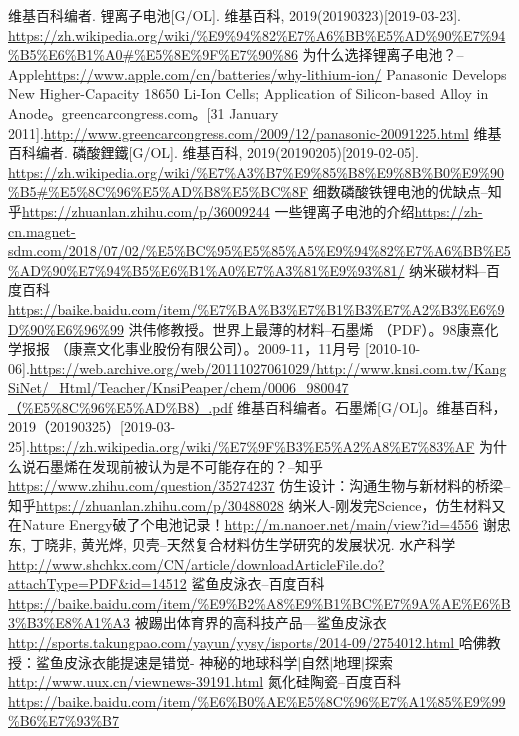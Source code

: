 \documentclass[UTF8,9pt]{ctexart}
\begin{document}
\begin{thebibliography}{99}  
    维基百科编者. 锂离子电池[G/OL]. 维基百科, 2019(20190323)[2019-03-23]. \url{https://zh.wikipedia.org/wiki/%E9%94%82%E7%A6%BB%E5%AD%90%E7%94%B5%E6%B1%A0#%E5%8E%9F%E7%90%86}
    为什么选择锂离子电池？--Apple\url{https://www.apple.com/cn/batteries/why-lithium-ion/}
    Panasonic Develops New Higher-Capacity 18650 Li-Ion Cells; Application of Silicon-based Alloy in Anode。greencarcongress.com。[31 January 2011].\url{http://www.greencarcongress.com/2009/12/panasonic-20091225.html}
    维基百科编者. 磷酸鋰鐵[G/OL]. 维基百科, 2019(20190205)[2019-02-05]. \url{https://zh.wikipedia.org/wiki/%E7%A3%B7%E9%85%B8%E9%8B%B0%E9%90%B5#%E5%8C%96%E5%AD%B8%E5%BC%8F}
    细数磷酸铁锂电池的优缺点--知乎\url{https://zhuanlan.zhihu.com/p/36009244}
    一些锂离子电池的介绍\url{https://zh-cn.magnet-sdm.com/2018/07/02/%E5%BC%95%E5%85%A5%E9%94%82%E7%A6%BB%E5%AD%90%E7%94%B5%E6%B1%A0%E7%A3%81%E9%93%81/}
    纳米碳材料--百度百科\url{https://baike.baidu.com/item/%E7%BA%B3%E7%B1%B3%E7%A2%B3%E6%9D%90%E6%96%99}
    洪伟修教授。世界上最薄的材料--石墨烯 （PDF）。98康熹化学报报 （康熹文化事业股份有限公司）。2009-11，11月号 [2010-10-06].\url{https://web.archive.org/web/20111027061029/http://www.knsi.com.tw/KangSiNet/_Html/Teacher/KnsiPeaper/chem/0006_980047（%E5%8C%96%E5%AD%B8）.pdf}
    维基百科编者。石墨烯[G/OL]。维基百科，2019（20190325）[2019-03-25].\url{https://zh.wikipedia.org/wiki/%E7%9F%B3%E5%A2%A8%E7%83%AF}
    为什么说石墨烯在发现前被认为是不可能存在的？--知乎\url{https://www.zhihu.com/question/35274237}
    仿生设计：沟通生物与新材料的桥梁--知乎\url{https://zhuanlan.zhihu.com/p/30488028}
    纳米人-刚发完Science，仿生材料又在Nature Energy破了个电池记录！\url{http://m.nanoer.net/main/view?id=4556}
    谢忠东, 丁晓非, 黄光烨, 贝壳--天然复合材料仿生学研究的发展状况. 水产科学\url{http://www.shchkx.com/CN/article/downloadArticleFile.do?attachType=PDF&id=14512}
    鲨鱼皮泳衣--百度百科\url{https://baike.baidu.com/item/%E9%B2%A8%E9%B1%BC%E7%9A%AE%E6%B3%B3%E8%A1%A3}
    被踢出体育界的高科技产品---鲨鱼皮泳衣\url{http://sports.takungpao.com/yayun/yysy/isports/2014-09/2754012.html }
    哈佛教授：鲨鱼皮泳衣能提速是错觉- 神秘的地球科学|自然|地理|探索\url{http://www.uux.cn/viewnews-39191.html}
    氮化硅陶瓷--百度百科\url{https://baike.baidu.com/item/%E6%B0%AE%E5%8C%96%E7%A1%85%E9%99%B6%E7%93%B7}

\end{thebibliography}
\end{document}
